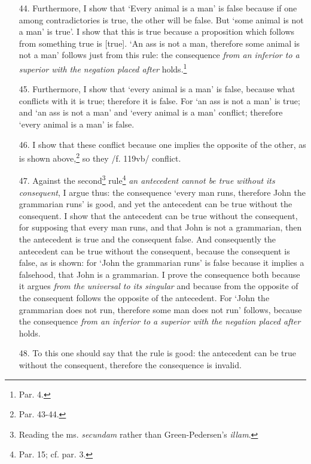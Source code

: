 \documentclass[]{article}
\begin{document}
\begin{enumerate}
\item[44.] Furthermore, I show that `Every animal is a man' is false because if one among contradictories is true, the other will be false. But `some animal is not a man' is true'. I show that this is true because a proposition which follows from something true is [true]. `An ass is not a man, therefore some animal is not a man' follows just from this rule: the consequence \textit{from an inferior to a superior with the negation placed after} holds.\footnote{Par. 4.}
\item[45.] Furthermore, I show that `every animal is a man' is false, because what conflicts with it is true; therefore it is false. For `an ass is not a man' is true; and `an ass is not a man' and `every animal is a man' conflict; therefore `every animal is a man' is false.
\item[46.] I show that these conflict because one implies the opposite of the other, as is shown above,\footnote{Par. 43-44.} so they /f. 119vb/ conflict.
\item[47.] Against the second\footnote{Reading the ms. \textit{secundam} rather than Green-Pedersen's \textit{illam}.} rule\footnote{Par. 15; cf. par. 3.} \textit{an antecedent cannot be true without its consequent}, I argue thus: the consequence `every man runs, therefore John the grammarian runs' is good, and yet the antecedent can be true without the consequent. I show that the antecedent can be true without the consequent, for supposing that every man runs, and that John is not a grammarian, then the antecedent is true and the consequent false. And consequently the antecedent can be true without the consequent, because the consequent is false, as is shown: for `John the grammarian runs' is false because it implies a falsehood, that John is a grammarian. I prove the consequence both because it argues \textit{from the universal to its singular} and because from the opposite of the consequent follows the opposite of the antecedent. For `John the grammarian does not run, therefore some man does not run' follows, because the  consequence \textit{from an inferior to a superior with the negation placed after} holds. 
\item[48.] To this one should say that the rule is good: the antecedent can be true without the consequent, therefore the consequence is invalid.


\end{enumerate}
\end{document}
